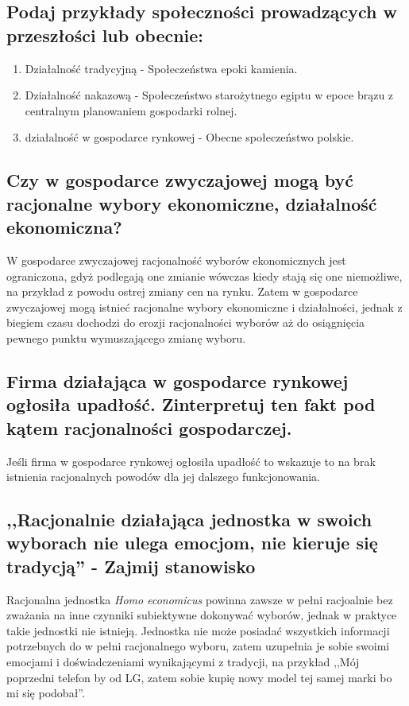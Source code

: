 \documentclass[a4paper,12pt]{article}
\begin{document}
\subsection{Podaj przykłady społeczności prowadzących w przeszłości lub obecnie:}

\begin{enumerate}
	\item Działalność tradycyjną - Społeczeństwa epoki kamienia.
	\item Działalność nakazową - Społeczeństwo starożytnego egiptu w epoce brązu z centralnym planowaniem gospodarki rolnej.
	\item działalność w gospodarce rynkowej - Obecne społeczeństwo polskie.
\end{enumerate}

\subsection{Czy w gospodarce zwyczajowej mogą być racjonalne wybory ekonomiczne, działalność ekonomiczna?}
W gospodarce zwyczajowej racjonalność wyborów ekonomicznych jest ograniczona, gdyż podlegają one zmianie wówczas kiedy stają się one niemożliwe, na przykład z powodu ostrej zmiany cen na rynku. Zatem w gospodarce zwyczajowej mogą istnieć racjonalne wybory ekonomiczne i działalności, jednak z biegiem czasu dochodzi do erozji racjonalności wyborów aż do osiągnięcia pewnego punktu wymuszającego zmianę wyboru.

\subsection{Firma działająca w gospodarce rynkowej ogłosiła upadłość. Zinterpretuj ten fakt pod kątem racjonalności gospodarczej.}

Jeśli firma w gospodarce rynkowej ogłosiła upadłość to wskazuje to na brak istnienia racjonalnych powodów dla jej dalszego funkcjonowania.

\subsection{,,Racjonalnie działająca jednostka w swoich wyborach nie ulega emocjom, nie kieruje się tradycją'' - Zajmij stanowisko}

Racjonalna jednostka \emph{Homo economicus} powinna zawsze w pełni racjoalnie bez zważania na inne czynniki subiektywne dokonywać wyborów, jednak w praktyce takie jednostki nie istnieją. Jednostka nie może posiadać wszystkich informacji potrzebnych do w pełni racjonalnego wyboru, zatem uzupełnia je sobie swoimi emocjami i doświadczeniami wynikającymi z tradycji, na przykład ,,Mój poprzedni telefon by od LG, zatem sobie kupię nowy model tej samej marki bo mi się podobał''.
\end{document}
